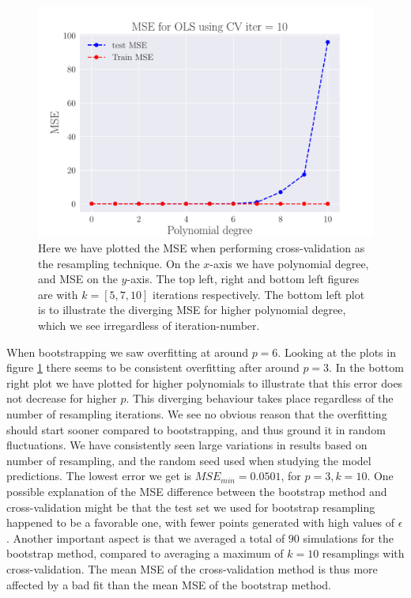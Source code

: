 \documentclass[reprint,english,notitlepage,aps,nobalancelastpage,nofootinbib]{revtex4-1}  %
\begin{document}
\begin{figure}[h]
	\endminipage\hfill
	\includegraphics[width=\linewidth]{MSE_OLS_n30_eps02_pol10_CV_re10.pdf}
	\endminipage
	\caption{Here we have plotted the MSE when performing cross-validation as the resampling technique. On the $x$-axis we have polynomial degree, and MSE on the $y$-axis. The top left, right and bottom left figures are with $k=[5, 7, 10]$ iterations respectively. The bottom left plot is to illustrate the diverging MSE for higher polynomial degree, which we see irregardless of iteration-number.} \label{fig:CV_OLS}
\end{figure}

When bootstrapping we saw overfitting at around $p=6$. Looking at the plots in figure \ref{fig:CV_OLS} there seems to be consistent overfitting after around $p=3$. In the bottom right plot we have plotted for higher polynomials to illustrate that this error does not decrease for higher $p$. This diverging behaviour takes place regardless of the number of resampling iterations. We see no obvious reason that the overfitting should start sooner compared to bootstrapping, and thus ground it in random fluctuations. We have consistently seen large variations in results based on number of resampling, and the random seed used when studying the model predictions. The lowest error we get is $MSE_{min}=0.0501$, for $p=3, k=10$. One possible explanation of the MSE difference between the bootstrap method and cross-validation might be that the test set we used for bootstrap resampling happened to be a favorable one, with fewer points generated with high values of $\epsilon$. Another important aspect is that we averaged a total of $90$ simulations for the bootstrap method, compared to averaging a maximum of $k=10$ resamplings with cross-validation. The mean MSE of the cross-validation method is thus more affected by a bad fit than the mean MSE of the bootstrap method.
\end{document}
